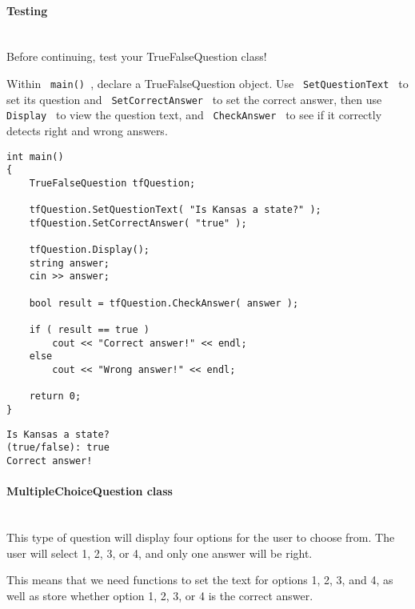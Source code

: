 \documentclass[a4paper,12pt]{book}
\begin{document}
                    \paragraph{ Testing } ~\\
                        Before continuing, test your TrueFalseQuestion class!

                        Within \texttt{ main() }, declare a TrueFalseQuestion object.
                        Use \texttt{ SetQuestionText } to set its question and
                        \texttt{ SetCorrectAnswer } to set the correct answer,
                        then use \texttt{ Display } to view the question text,
                        and \texttt{ CheckAnswer } to see if it correctly detects
                        right and wrong answers. \newpage

\begin{lstlisting}[style=code]
int main()
{
    TrueFalseQuestion tfQuestion;

    tfQuestion.SetQuestionText( "Is Kansas a state?" );
    tfQuestion.SetCorrectAnswer( "true" );

    tfQuestion.Display();
    string answer;
    cin >> answer;

    bool result = tfQuestion.CheckAnswer( answer );

    if ( result == true )
        cout << "Correct answer!" << endl;
    else
        cout << "Wrong answer!" << endl;

    return 0;
}
\end{lstlisting}

\begin{lstlisting}[style=output]
Is Kansas a state?
(true/false): true
Correct answer!
\end{lstlisting}

                    \newpage
                    \paragraph{ MultipleChoiceQuestion class } ~\\
                        This type of question will display four options
                        for the user to choose from. The user will select
                        1, 2, 3, or 4, and only one answer will be right.
                        
                        This means that we need functions to set the
                        text for options 1, 2, 3, and 4, as well as
                        store whether option 1, 2, 3, or 4 is the
                        correct answer.
\end{document}
